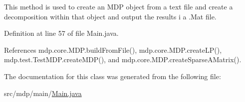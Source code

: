 This method is used to create an M\+D\+P object from a text file and create a decomposition within that object and output the results i a .Mat file. 



Definition at line 57 of file Main.\+java.



References mdp.\+core.\+M\+D\+P.\+build\+From\+File(), mdp.\+core.\+M\+D\+P.\+create\+L\+P(), mdp.\+test.\+Test\+M\+D\+P.\+create\+M\+D\+P(), and mdp.\+core.\+M\+D\+P.\+create\+Sparse\+A\+Matrix().



The documentation for this class was generated from the following file\+:\begin{DoxyCompactItemize}
\item 
src/mdp/main/\hyperlink{_main_8java}{Main.\+java}\end{DoxyCompactItemize}
